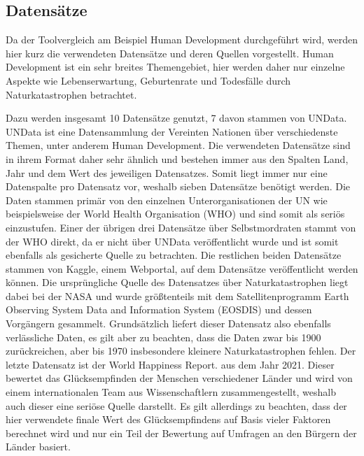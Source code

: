 \documentclass[12pt]{article}
\begin{document}
	\subsection{Datensätze}
	Da der Toolvergleich am Beispiel Human Development durchgeführt wird, werden hier kurz die verwendeten Datensätze und deren Quellen vorgestellt.
	Human Development ist ein sehr breites Themengebiet, hier werden daher nur einzelne Aspekte wie Lebenserwartung, Geburtenrate und Todesfälle durch Naturkatastrophen betrachtet.
	
	Dazu werden insgesamt 10 Datensätze genutzt, 7 davon stammen von UNData. UNData ist eine Datensammlung der Vereinten Nationen über verschiedenste Themen, unter anderem Human Development. Die verwendeten Datensätze sind in ihrem Format daher sehr ähnlich und bestehen immer aus den Spalten Land, Jahr und dem Wert des jeweiligen Datensatzes. Somit liegt immer nur eine Datenspalte pro Datensatz vor, weshalb sieben Datensätze benötigt werden. Die Daten stammen primär von den einzelnen Unterorganisationen der UN wie beispielsweise der World Health Organisation (WHO) und sind somit als seriös einzustufen. Einer der übrigen drei Datensätze über Selbstmordraten stammt von der WHO direkt, da er nicht über UNData veröffentlicht wurde und ist somit ebenfalls als gesicherte Quelle zu betrachten. Die restlichen beiden Datensätze stammen von Kaggle, einem Webportal, auf dem Datensätze veröffentlicht werden können. Die ursprüngliche Quelle des Datensatzes über Naturkatastrophen liegt dabei bei der NASA und wurde größtenteils mit dem Satellitenprogramm Earth Observing System Data and Information System (EOSDIS) und dessen Vorgängern gesammelt. Grundsätzlich liefert dieser Datensatz also ebenfalls verlässliche Daten, es gilt aber zu beachten, dass die Daten zwar bis 1900 zurückreichen, aber bis 1970 insbesondere kleinere Naturkatastrophen fehlen. Der letzte Datensatz ist der World Happiness Report.
	aus dem Jahr 2021. Dieser bewertet das Glücksempfinden der Menschen verschiedener Länder und wird von einem internationalen Team aus Wissenschaftlern zusammengestellt, weshalb auch dieser eine seriöse Quelle darstellt. Es gilt allerdings zu beachten, dass der hier verwendete finale Wert des Glücksempfindens auf Basis vieler Faktoren berechnet wird und nur ein Teil der Bewertung auf Umfragen an den Bürgern der Länder basiert.
	
\end{document}
